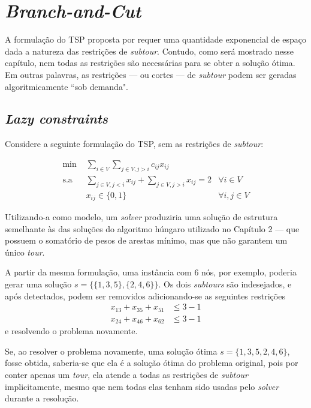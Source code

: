 \chapter{\textit{Branch-and-Cut}}
A formulação do TSP proposta por requer uma quantidade exponencial de espaço dada a natureza das restrições de \textit{subtour}. Contudo, como será mostrado nesse capítulo, nem todas as restrições são necessárias para se obter a solução ótima. Em outras palavras, as restrições --- ou cortes --- de \textit{subtour} podem ser geradas algoritmicamente ``sob demanda".

\section{\textit{Lazy constraints}}
Considere a seguinte formulação do TSP, sem as restrições de \textit{subtour}:

\begin{align*}
    \text{min }& \sum_{i \in V}\sum_{j \in V, j > i}c_{ij} x_{ij} &\\
    \text{s.a }& \sum_{j \in V, j < i}x_{ij}  +  \sum_{j \in V, j > i}x_{ij} = 2  &\forall i \in V \\
    & x_{ij} \in \{0, 1\} &\forall i, j \in V
    \label{TSPsemsub}
\end{align*}

Utilizando-a como modelo, um \textit{solver} produziria uma solução de estrutura semelhante às das soluções do algoritmo húngaro utilizado no Capítulo 2 --- que possuem o somatório de pesos de arestas mínimo, mas que não garantem um único \textit{tour}. 

A partir da mesma formulação, uma instância com 6 nós, por exemplo, poderia gerar uma solução \(s = \{\{1,3,5\}, \{2,4,6\}\}\). Os dois \textit{subtours} são indesejados, e após detectados, podem ser removidos adicionando-se as seguintes restrições 
\begin{align}
    x_{13} + x_{35} + x_{51} &\leq 3 - 1 \\  
    x_{24} + x_{46} + x_{62} &\leq 3 - 1 
\end{align}
e resolvendo o problema novamente.

Se, ao resolver o problema novamente, uma solução ótima \(s = \{1, 3, 5, 2, 4 , 6\}\), fosse obtida, saberia-se que ela é a solução ótima do problema original, pois por conter apenas um \textit{tour}, ela atende a todas as restrições de \textit{subtour} implicitamente, mesmo que nem todas elas tenham sido usadas pelo \textit{solver} durante a resolução.

